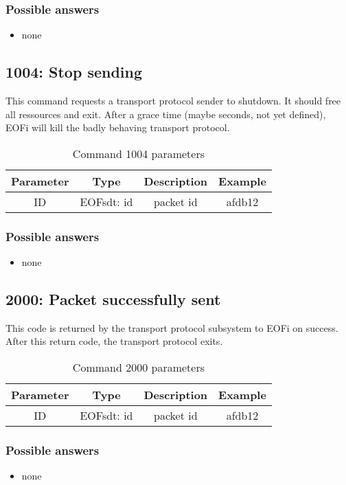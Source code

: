 \subsubsection{Possible answers}
\begin{itemize}
\item none
\end{itemize}
\subsection{1004: Stop sending}
%
This command requests a transport protocol sender to shutdown.
It should free all ressources and exit. After a grace time (maybe seconds,
not yet defined), EOFi will kill the badly behaving transport protocol.
\begin{longtable}{|c|c|c|c|}
\caption{Command 1004 parameters}\\
\hline
\textbf{Parameter} & \textbf{Type} & \textbf{Description} & \textbf{Example}\\
\hline
ID & EOFsdt: id & packet id & afdb12\\
\hline
\end{longtable}
\subsubsection{Possible answers}
\begin{itemize}
\item none
\end{itemize}
\subsection{2000: Packet successfully sent}
This code is returned by the transport protocol subsystem to EOFi on success.
After this return code, the transport protocol exits.
\begin{longtable}{|c|c|c|c|}
\caption{Command 2000 parameters}\\
\hline
\textbf{Parameter} & \textbf{Type} & \textbf{Description} & \textbf{Example}\\
\hline
ID & EOFsdt: id & packet id & afdb12\\
\hline
\end{longtable}
\subsubsection{Possible answers}
\begin{itemize}
\item none
\end{itemize}
